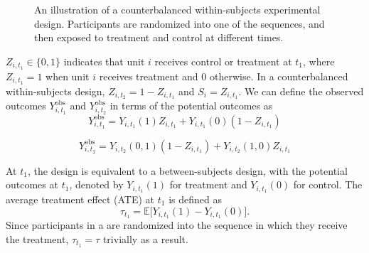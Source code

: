 \begin{figure}
    \centering
    \caption{An illustration of a counterbalanced within-subjects experimental design. Participants are randomized into one of the sequences, and then exposed to treatment and control at different times. }
    \label{fig:CWSD_Figure}
\end{figure}

$Z_{i,t_1} \in \{0,1\}$ indicates that unit $i$ receives control or treatment at $t_1$, where $Z_{i,t_1} = 1$ when unit $i$ receives treatment and 0 otherwise. In a counterbalanced within-subjects design, $Z_{i,t_2} = 1 - Z_{i,t_1}$ and $S_i = Z_{i,t_1}$. We can define the observed outcomes $Y_{i, t_1}^{\text{obs}}$ and $Y_{i, t_2}^{\text{obs}}$ in terms of the potential outcomes as
\begin{equation}
    Y_{i,t_1}^{\text{obs}} = Y_{i,t_1}(1)Z_{i,t_1} + Y_{i,t_1}(0)(1-Z_{i,t_1})
\end{equation}

\begin{equation}
\label{equation: t2_identity_cwsd} 
    Y_{i,t_2}^{\text{obs}} = Y_{i,t_2}(0,1)(1-Z_{i,t_1}) + Y_{i,t_2}(1,0)Z_{i,t_1}
\end{equation}

At $t_1$, the design is equivalent to a between-subjects design, with the potential outcomes at $t_1$, denoted by $Y_{i,t_1}(1)$ for treatment and $Y_{i,t_1}(0)$ for control. The average treatment effect (ATE) at $t_1$ is defined as
\[
\tau_{t_1} = \mathbb{E}\big[Y_{i,t_1}(1) - Y_{i,t_1}(0)\big].
\]
Since participants in a \cwsd{} are randomized into the sequence in which they receive the treatment, $\tau_{t_1} = \tau$ trivially as a result.

